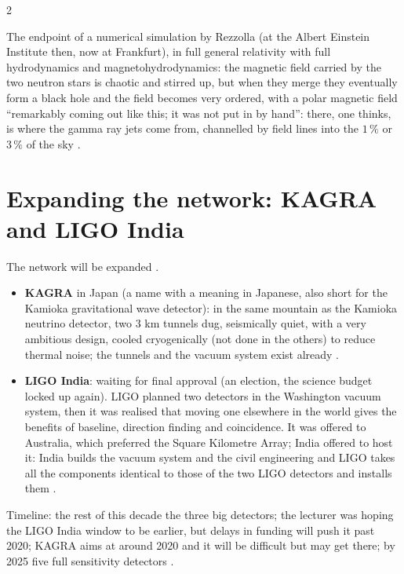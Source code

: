 \begin{paracol}{2}
\begin{aside}
The endpoint of a numerical simulation by Rezzolla (at the Albert Einstein Institute then, now at Frankfurt), in full general relativity with full hydrodynamics and magnetohydrodynamics: the magnetic field carried by the two neutron stars is chaotic and stirred up, but when they merge they eventually form a black hole and the field becomes very ordered, with a polar magnetic field ``remarkably coming out like this; it was not put in by hand'': there, one thinks, is where the gamma ray jets come from, channelled by field lines into the $1\,\%$ or $3\,\%$ of the sky .
\end{aside}

\section{Expanding the network: KAGRA and LIGO India}\label{sec:c27-network2}

The network will be expanded .
\begin{itemize}
  \item \textbf{KAGRA} in Japan (a name with a meaning in Japanese, also short for the Kamioka gravitational wave detector): in the same mountain as the Kamioka neutrino detector, two $3$ km tunnels dug, seismically quiet, with a very ambitious design, cooled cryogenically (not done in the others) to reduce thermal noise; the tunnels and the vacuum system exist already .
  \item \textbf{LIGO India}: waiting for final approval (an election, the science budget locked up again). LIGO planned two detectors in the Washington vacuum system, then it was realised that moving one elsewhere in the world gives the benefits of baseline, direction finding and coincidence. It was offered to Australia, which preferred the Square Kilometre Array; India offered to host it: India builds the vacuum system and the civil engineering and LIGO takes all the components identical to those of the two LIGO detectors and installs them .
\end{itemize}
Timeline: the rest of this decade the three big detectors; the lecturer was hoping the LIGO India window to be earlier, but delays in funding will push it past 2020; KAGRA aims at around 2020 and it will be difficult but may get there; by 2025 five full sensitivity detectors .


\end{paracol}
